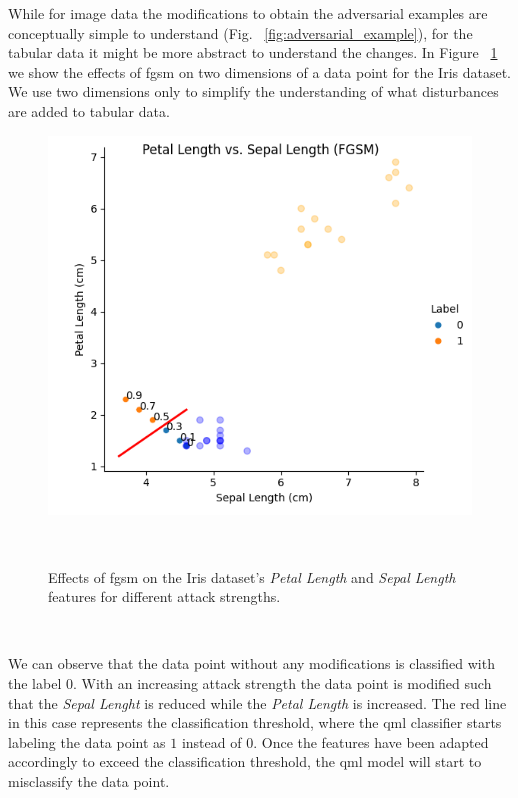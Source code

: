 While for image data the modifications to obtain the adversarial
examples are conceptually simple to understand (Fig.
~\ref{fig:adversarial_example}), for the tabular data it
might be more abstract to understand the changes. In Figure
~\ref{fig:adversarial_tabular} we show the effects of \ac{fgsm}
on two dimensions of a data point for the Iris dataset. We use
two dimensions only to simplify the understanding of what
disturbances are added to tabular data. \

\begin{figure}[h!]
  \includegraphics[scale=0.75]{figures/tabular-adversarial.png}
  \centering
  \caption{Effects of \ac{fgsm} on the Iris dataset's \textit{Petal Length} and \textit{Sepal Length} features for different attack strengths.}
~\label{fig:adversarial_tabular}
\end{figure} \

We can observe that the data point without any modifications
is classified with the label \(0\). With an increasing attack
strength the data point is modified such that the \textit{Sepal
Lenght} is reduced while the \textit{Petal Length} is increased.
The red line in this case represents the classification threshold,
where the \ac{qml} classifier starts labeling the data point as
\(1\) instead of \(0\). Once the features have been adapted
accordingly to exceed the classification threshold, the \ac{qml}
model will start to misclassify the data point. \

